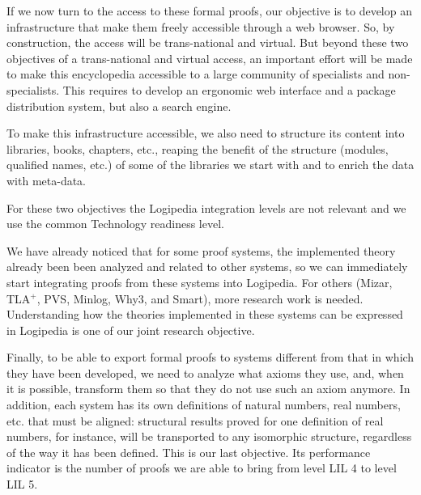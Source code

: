 If we now turn to the access to these formal proofs, our objective is
to develop an infrastructure that make them freely accessible through
a web browser. So, by construction, the access will be trans-national
and virtual. But beyond these two objectives of a trans-national and
virtual access, an important effort will be made to make this
encyclopedia accessible to a large community of specialists and
non-specialists.  This requires to develop an ergonomic web interface
and a package distribution system, but also a search engine.

To make this infrastructure accessible, we also need to structure its
content into libraries, books, chapters, etc., reaping the benefit of
the structure (modules, qualified names, etc.) of some of the
libraries we start with and to enrich the data with meta-data.

For these two objectives the Logipedia integration levels are not
relevant and we use the common Technology readiness level.

We have already noticed that for some proof systems, the implemented
theory already been been analyzed and related to other systems, so we
can immediately start integrating proofs from these systems into
Logipedia. For others (Mizar, TLA$^+$, PVS, Minlog, Why3, and Smart), 
more research work is needed. Understanding how the theories
implemented in these systems can be expressed in Logipedia is one of
our joint research objective.

Finally, to be able to export formal proofs to systems different from
that in which they have been developed, we need to analyze what axioms
they use, and, when it is possible, transform them so that they do not
use such an axiom anymore.  In addition, each system has its own
definitions of natural numbers, real numbers, etc. that must be
aligned: structural results proved for one definition of real numbers,
for instance, will be transported to any isomorphic structure,
regardless of the way it has been defined. This is our last objective.
Its performance indicator is the number of proofs we are able to
bring from level LIL 4 to level LIL 5.

